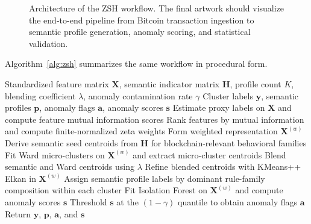 \documentclass{ieeeaccess}
\begin{document}
\begin{figure}[!t]
\centering
{}
\caption{Architecture of the ZSH workflow. The final artwork should visualize the end-to-end pipeline from Bitcoin transaction ingestion to semantic profile generation, anomaly scoring, and statistical validation.}
\label{fig:architecture}
\end{figure}

Algorithm~\ref{alg:zsh} summarizes the same workflow in procedural form.

\begin{algorithm}[!t]
\caption{ZSH profiling workflow}
\label{alg:zsh}
\begin{algorithmic}[1]
\Require Standardized feature matrix $\mathbf{X}$, semantic indicator matrix $\mathbf{H}$, profile count $K$, blending coefficient $\lambda$, anomaly contamination rate $\gamma$
\Ensure Cluster labels $\mathbf{y}$, semantic profiles $\mathbf{p}$, anomaly flags $\mathbf{a}$, anomaly scores $\mathbf{s}$
\State Estimate proxy labels on $\mathbf{X}$ and compute feature mutual information scores
\State Rank features by mutual information and compute finite-normalized zeta weights
\State Form weighted representation $\mathbf{X}^{(w)}$
\State Derive semantic seed centroids from $\mathbf{H}$ for blockchain-relevant behavioral families
\State Fit Ward micro-clusters on $\mathbf{X}^{(w)}$ and extract micro-cluster centroids
\State Blend semantic and Ward centroids using $\lambda$
\State Refine blended centroids with KMeans++ Elkan in $\mathbf{X}^{(w)}$
\State Assign semantic profile labels by dominant rule-family composition within each cluster
\State Fit Isolation Forest on $\mathbf{X}^{(w)}$ and compute anomaly scores $\mathbf{s}$
\State Threshold $\mathbf{s}$ at the $(1-\gamma)$ quantile to obtain anomaly flags $\mathbf{a}$
\State Return $\mathbf{y}$, $\mathbf{p}$, $\mathbf{a}$, and $\mathbf{s}$
\end{algorithmic}
\end{algorithm}
\end{document}
